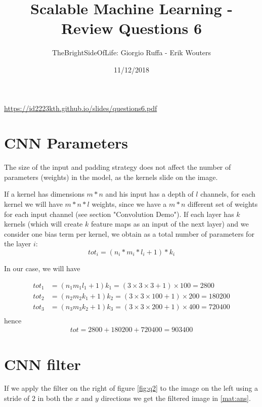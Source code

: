 \documentclass[a4paper]{article}
\title{Scalable Machine Learning - Review Questions 6}
\author{TheBrightSideOfLife: Giorgio Ruffa - Erik Wouters}
\date{11/12/2018}
\begin{document}
\maketitle

\url{https://id2223kth.github.io/slides/questions6.pdf}

\section{CNN Parameters}

The size of the input and padding strategy does not affect the number of parameters (weights) in the model, as the kernels slide on the image.

If a kernel has dimensions $m * n$ and his input has a depth of $l$ channels, for each kernel we will have $m * n * l$ weights, since we have a $m * n$ different set of weights for each input channel (see \cite{cnntutorial} section "Convolution Demo").
If each layer has $k$ kernels (which will create $k$ feature maps as an input of the next layer) and we consider one bias term per kernel, we obtain as a total number of parameters for the layer $i$:
\begin{equation}
    tot_{i} = (n_{i} * m_{i} * l_{i} + 1) * k_{i} 
\end{equation}

In our case, we will have

\begin{equation*}
\begin{split}
    tot_{1} &= (n_{1} m_{1} l_{1} + 1) k_{1} = (3 \times 3  \times 3 + 1 ) \times 100 = 2800 \\
    tot_{2} &= (n_{2} m_{2} k_{1} + 1) k_{2} = (3 \times 3  \times 100 + 1 ) \times 200 = 180200  \\
    tot_{3} &= (n_{3} m_{3} k_{2} + 1) k_{3} = (3 \times 3  \times 200 + 1 ) \times 400 = 720400 \\
\end{split}    
\end{equation*}
hence
\begin{equation*}
\begin{split}
    tot = 2800 + 180200 + 720400 = 903400
\end{split}    
\end{equation*}




\section{CNN filter}
If we apply the filter on the right of figure \ref{fig:q2} to the image on the left using a stride of $2$ in both the $x$ and $y$ directions we get the filtered image in \ref{mat:ans}.
\end{document}
